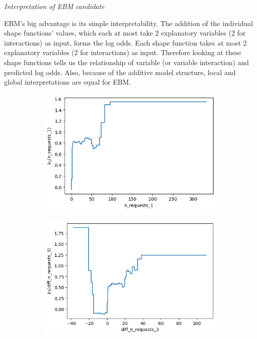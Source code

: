\documentclass[12pt,titlepage]{article}
\begin{document}
\textit{Interpretation of EBM candidate}

EBM's big advantage is its simple interpretability. The addition of the individual shape functions' values, which each at most take 2 explanatory variables (2 for interactions) as input, forms the log odds. Each shape function takes at most 2 explanatory variables (2 for interactions) as input. Therefore looking at these shape functions tells us the relationship of variable (or variable interaction) and predicted log odds. Also, because of the additive model structure, local and global interpretations are equal for EBM. \\

\begin{figure}
    \centering
        \begin{subfigure}{.55\textwidth}
          \centering
          \includegraphics[width=1\linewidth]{shape_function_n_requests_1.png}
        \end{subfigure}%
        \begin{subfigure}{.55\textwidth}
          \centering
          \includegraphics[width=1\linewidth]{shape_function_diff_n_requests_3.png}

\end{subfigure}
\end{figure}
\end{document}
